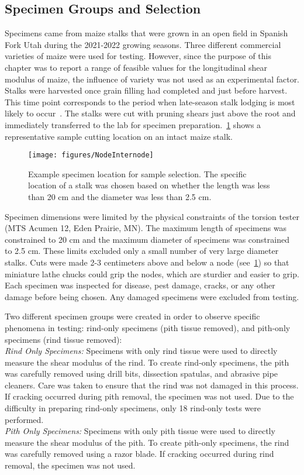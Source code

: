 \subsection{Specimen Groups and Selection}
\label{ssec:specimen_groups_and_selection}
Specimens came from maize stalks that were grown in an open field in Spanish Fork Utah during the 2021-2022 growing seasons. Three different commercial varieties of maize were used for testing. However, since the purpose of this chapter was to report a range of feasible values for the longitudinal shear modulus of maize, the influence of variety was not used as an experimental factor. Stalks were harvested once grain filling had completed and just before harvest. This time point corresponds to the period when late-season stalk lodging is most likely to occur~. The stalks were cut with pruning shears just above the root and immediately transferred to the lab for specimen preparation.~\cref{fig:NodeInternode} shows a representative sample cutting location on an intact maize stalk.

\begin{figure}[htbp]
	\centering
	\texttt{[image: figures/NodeInternode]}
	\caption[Example specimen location for sample selection.]{Example specimen location for sample selection. The specific location of a stalk was chosen based on whether the length was less than 20 cm and the diameter was less than 2.5 cm.}
	\label{fig:NodeInternode}
\end{figure}

Specimen dimensions were limited by the physical constraints of the torsion tester (MTS Acumen 12, Eden Prairie, MN). The maximum length of specimens was constrained to 20 cm and the maximum diameter of specimens was constrained to 2.5 cm. These limits excluded only a small number of very large diameter stalks. Cuts were made 2-3 centimeters above and below a node (see~\cref{fig:NodeInternode}) so that miniature lathe chucks could grip the nodes, which are sturdier and easier to grip. Each specimen was inspected for disease, pest damage, cracks, or any other damage before being chosen. Any damaged specimens were excluded from testing.

Two different specimen groups were created in order to observe specific phenomena in testing: rind-only specimens (pith tissue removed), and pith-only specimens (rind tissue removed):
\\ \hfill \break
\textit{Rind Only Specimens:} Specimens with only rind tissue were used to directly measure the shear modulus of the rind. To create rind-only specimens, the pith was carefully removed using drill bits, dissection spatulas, and abrasive pipe cleaners. Care was taken to ensure that the rind was not damaged in this process. If cracking occurred during pith removal, the specimen was not used. Due to the difficulty in preparing rind-only specimens, only 18 rind-only tests were performed. 
\\ \hfill \break
\noindent\textit{Pith Only Specimens:} Specimens with only pith tissue were used to directly measure the shear modulus of the pith. To create pith-only specimens, the rind was carefully removed using a razor blade. If cracking occurred during rind removal, the specimen was not used.

